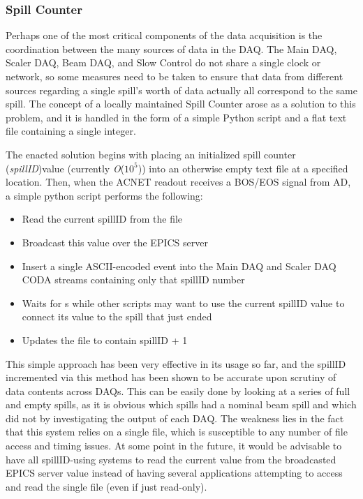 \subsubsection{Spill Counter}

Perhaps one of the most critical components of the data acquisition is the coordination between the many sources of data in the DAQ. The Main DAQ, Scaler DAQ, Beam DAQ, and Slow Control do not share a single clock or network, so some measures need to be taken to ensure that data from different sources regarding a single spill's worth of data actually all correspond to the same spill. The concept of a locally maintained Spill Counter arose as a solution to this problem, and it is handled in the form of a simple Python script and a flat text file containing a single integer.

The enacted solution begins with placing an initialized spill counter (\emph{spillID})value (currently \emph{O}($10^5$)) into an otherwise empty text file at a specified location. Then, when the ACNET readout receives a BOS/EOS signal from AD, a simple python script performs the following:
\begin{itemize}
	\item Read the current spillID from the file
	\item Broadcast this value over the EPICS server
	\item Insert a single ASCII-encoded event into the Main DAQ and Scaler DAQ CODA streams containing only that spillID number
	\item Waits for \unit[20]{s} while other scripts may want to use the current spillID value to connect its value to the spill that just ended
	\item Updates the file to contain spillID + 1
\end{itemize}

This simple approach has been very effective in its usage so far, and the spillID incremented via this method has been shown to be accurate upon scrutiny of data contents across DAQs. This can be easily done by looking at a series of full and empty spills, as it is obvious which spills had a nominal beam spill and which did not by investigating the output of each DAQ. The weakness lies in the fact that this system relies on a single file, which is susceptible to any number of file access and timing issues. At some point in the future, it would be advisable to have all spillID-using systems to read the current value from the broadcasted EPICS server value instead of having several applications attempting to access and read the single file (even if just read-only).

